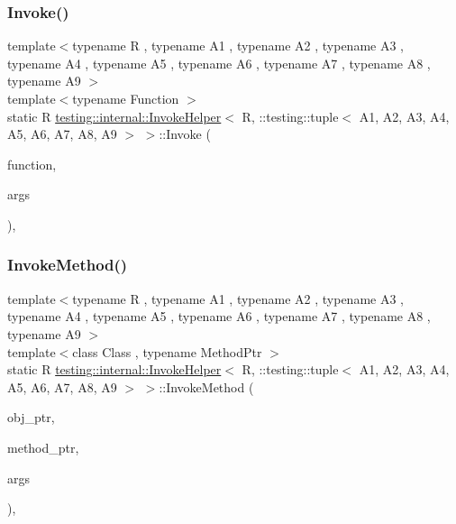 \subsubsection{\texorpdfstring{Invoke()}{Invoke()}}
{\footnotesize\ttfamily template$<$typename R , typename A1 , typename A2 , typename A3 , typename A4 , typename A5 , typename A6 , typename A7 , typename A8 , typename A9 $>$ \\
template$<$typename Function $>$ \\
static R \mbox{\hyperlink{classtesting_1_1internal_1_1InvokeHelper}{testing\+::internal\+::\+Invoke\+Helper}}$<$ R, \+::testing\+::tuple$<$ A1, A2, A3, A4, A5, A6, A7, A8, A9 $>$ $>$\+::Invoke (\begin{DoxyParamCaption}\item[{\mbox{\hyperlink{structtesting_1_1internal_1_1Function}{Function}}}]{function,  }\item[{const \+::testing\+::tuple$<$ A1, A2, A3, A4, A5, A6, A7, A8, A9 $>$ \&}]{args }\end{DoxyParamCaption})\hspace{0.3cm}{\ttfamily [inline]}, {\ttfamily [static]}}

\mbox{\label{classtesting_1_1internal_1_1InvokeHelper_3_01R_00_01_1_1testing_1_1tuple_3_01A1_00_01A2_00_01A3_1c5f66c8b5e7674a520f1ea38507628c_ab468cf4a3e1ff2fa33a60ce3459c17f7}} 
\subsubsection{\texorpdfstring{InvokeMethod()}{InvokeMethod()}}
{\footnotesize\ttfamily template$<$typename R , typename A1 , typename A2 , typename A3 , typename A4 , typename A5 , typename A6 , typename A7 , typename A8 , typename A9 $>$ \\
template$<$class Class , typename Method\+Ptr $>$ \\
static R \mbox{\hyperlink{classtesting_1_1internal_1_1InvokeHelper}{testing\+::internal\+::\+Invoke\+Helper}}$<$ R, \+::testing\+::tuple$<$ A1, A2, A3, A4, A5, A6, A7, A8, A9 $>$ $>$\+::Invoke\+Method (\begin{DoxyParamCaption}\item[{Class $\ast$}]{obj\+\_\+ptr,  }\item[{Method\+Ptr}]{method\+\_\+ptr,  }\item[{const \+::testing\+::tuple$<$ A1, A2, A3, A4, A5, A6, A7, A8, A9 $>$ \&}]{args }\end{DoxyParamCaption})\hspace{0.3cm}{\ttfamily [inline]}, {\ttfamily [static]}}



